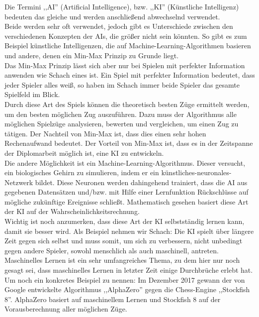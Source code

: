 \documentclass[12pt,a4paper]{article}
\begin{document}
Die Termini ,,AI'' (Artificial Intelligence), bzw. ,,KI'' (Künstliche Intelligenz) bedeuten das gleiche und werden anschließend abwechselnd verwendet. \\
Beide werden sehr oft verwendet, jedoch gibt es Unterschiede zwischen den verschiedenen Konzepten der AIs, die größer nicht sein könnten. So gibt es zum Beispiel künstliche Intelligenzen, die auf Machine-Learning-Algorithmen basieren und andere, denen ein Min-Max Prinzip zu Grunde liegt. \\
Das Min-Max Prinzip lässt sich aber nur bei Spielen mit perfekter Information anwenden wie Schach eines ist. Ein Spiel mit perfekter Information bedeutet, dass jeder Spieler alles weiß, so haben im Schach immer beide Spieler das gesamte Spielfeld im Blick. \\[2ex]
Durch diese Art des Spiels können die theoretisch besten Züge ermittelt werden, um den besten möglichen Zug auszuführen. Dazu muss der Algorithmus alle möglichen Spielzüge analysieren, bewerten und vergleichen, um einen Zug zu tätigen. Der Nachteil von Min-Max ist, dass dies einen sehr hohen Rechenaufwand bedeutet. Der Vorteil von Min-Max ist, dass es in der Zeitspanne der Diplomarbeit möglich ist, eine KI zu entwickeln.\\[2ex]
Die andere Möglichkeit ist ein Machine-Learning-Algorithmus. Dieser versucht, ein biologisches Gehirn zu simulieren, indem er ein künstliches-neuronales-Netzwerk bildet. Diese Neuronen werden dahingehend trainiert, dass die AI aus gegebenen Datensätzen und/bzw. mit Hilfe einer Lernfunktion Rückschlüsse auf mögliche zukünftige Ereignisse schließt. Mathematisch gesehen basiert diese Art der KI auf der Wahrscheinlichkeitsrechnung.  \\
Wichtig ist noch anzumerken, dass diese Art der KI selbstständig lernen kann, damit sie besser wird. Als Beispiel nehmen wir Schach: Die KI spielt über längere Zeit gegen sich selbst und muss somit, um sich zu verbessern, nicht unbedingt gegen andere Spieler, sowohl menschlich als auch maschinell, antreten. \\
Maschinelles Lernen ist ein sehr umfangreiches Thema, zu dem hier nur noch gesagt sei, dass maschinelles Lernen in letzter Zeit einige Durchbrüche erlebt hat. Um noch ein konkretes Beispiel zu nennen: Im Dezember 2017 gewann der von Google entwickelte Algorithmus ,,AlphaZero'' gegen die Chess-Engine ,,Stockfish 8''. AlphaZero basiert auf maschinellem Lernen und Stockfish 8 auf der Vorausberechnung aller möglichen Züge.\cite{SkyNet} \\[2ex]
\end{document}
